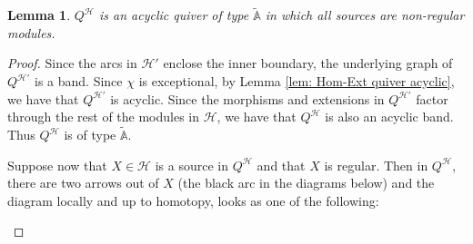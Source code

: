 \documentclass[12pt]{amsart}
\theoremstyle{plain}
\newtheorem{lem}[thm]{Lemma}
\theoremstyle{definition}
\theoremstyle{remark}
\begin{document}
\begin{lem} \label{lem: affine A subquiver with non-regular source} 
$Q^{\mathcal{H}}$ is an acyclic quiver of type $\tilde{\mathbb{A}}$ in which all sources are non-regular modules.
\end{lem}

\begin{proof}
Since the arcs in $\mathcal{H}'$ enclose the inner boundary, the underlying graph of $Q^{\mathcal{H}'}$ is a band. Since $\chi$ is exceptional, by Lemma \ref{lem: Hom-Ext quiver acyclic}, we have that $Q^{\mathcal{H}'}$ is acyclic. Since the morphisms and extensions in $Q^{\mathcal{H}'}$ factor through the rest of the modules in $\mathcal{H}$, we have that $Q^{\mathcal{H}}$ is also an acyclic band. Thus $Q^{\mathcal{H}}$ is of type $\tilde{\mathbb{A}}$. 

Suppose now that $X \in \mathcal{H}$ is a source in $Q^{\mathcal{H}}$ and that $X$ is regular. Then in $Q^{\mathcal{H}}$, there are two arrows out of $X$ (the black arc in the diagrams below) and the diagram locally and up to homotopy, looks as one of the following:

\begin{center}



\end{center}
\end{proof}
\end{document}
